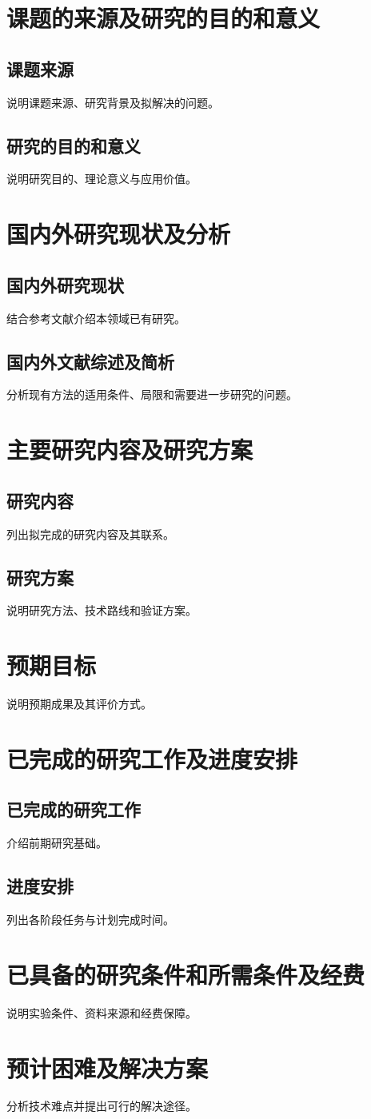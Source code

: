 \section{课题的来源及研究的目的和意义}
\subsection{课题来源}
说明课题来源、研究背景及拟解决的问题。
\subsection{研究的目的和意义}
说明研究目的、理论意义与应用价值。
\section{国内外研究现状及分析}
\subsection{国内外研究现状}
结合参考文献介绍本领域已有研究。
\subsection{国内外文献综述及简析}
分析现有方法的适用条件、局限和需要进一步研究的问题。
\section{主要研究内容及研究方案}
\subsection{研究内容}
列出拟完成的研究内容及其联系。
\subsection{研究方案}
说明研究方法、技术路线和验证方案。
\section{预期目标}
说明预期成果及其评价方式。
\section{已完成的研究工作及进度安排}
\subsection{已完成的研究工作}
介绍前期研究基础。
\subsection{进度安排}
列出各阶段任务与计划完成时间。
\section{已具备的研究条件和所需条件及经费}
说明实验条件、资料来源和经费保障。
\section{预计困难及解决方案}
分析技术难点并提出可行的解决途径。
\backmatter
\nocite{*}

